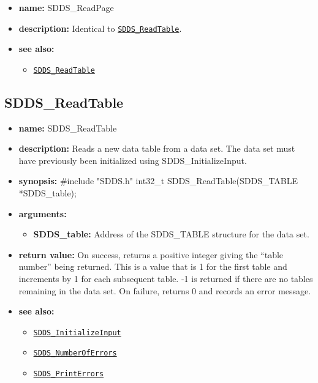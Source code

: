 \documentclass[11pt]{article}
\newcommand{\progref}[1]{\hyperref[SDDS_#1]{\tt SDDS\_#1}}
\begin{document}
\begin{itemize}
\item {\bf name:}\newline
SDDS\_ReadPage
\item {\bf description:}\newline
Identical to \progref{ReadTable}.
\item {\bf see also:}
\begin{itemize}
\item \progref{ReadTable}
\end{itemize}
\end{itemize}

\subsection{SDDS\_ReadTable}
\label{SDDS_ReadTable}

\begin{itemize}
\item {\bf name:}\newline
SDDS\_ReadTable
\item {\bf description:}\newline
Reads a new data table from a data set. The data set must have previously been initialized using SDDS\_InitializeInput.
\item {\bf synopsis:} \#include "SDDS.h"\newline
int32\_t SDDS\_ReadTable(SDDS\_TABLE *SDDS\_table);
\item {\bf arguments:}
\begin{itemize}
\item {\bf SDDS\_table:} Address of the SDDS\_TABLE structure for the data set.
\end{itemize}
\item {\bf return value:}\newline
On success, returns a positive integer giving the ``table number'' being returned. This is a value that is 1 for the first table and increments by 1 for each subsequent table. -1 is returned if there are no tables remaining in the data set.\newline
\newline
On failure, returns 0 and records an error message. 
\item {\bf see also:}
\begin{itemize}
\item \progref{InitializeInput}
\item \progref{NumberOfErrors}
\item \progref{PrintErrors}
\end{itemize}
\end{itemize}
\end{document}
